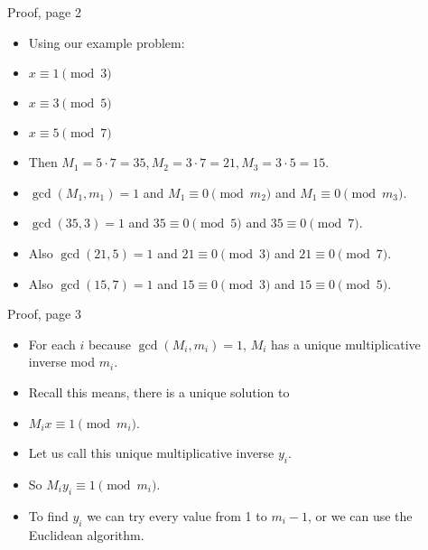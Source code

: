 \documentclass[handout]{beamer}
\begin{document}
\begin{frame}{Proof, page 2}

\begin{itemize}
  \item Using our example problem:
  \item $x \equiv 1 \pmod 3$
  \item $x \equiv 3 \pmod 5$
  \item $x \equiv 5 \pmod 7$
  \item Then $M_1 = 5\cdot 7 = 35, M_2 = 3\cdot 7 = 21, M_3 = 3\cdot 5 = 15$.
  \item $\gcd(M_1, m_1) = 1$ and $M_1 \equiv 0 \pmod {m_2}$ and $M_1 \equiv 0 \pmod {m_3}$.
  \item $\gcd(35,3) = 1$ and $35\equiv 0 \pmod 5$ and $35 \equiv 0 \pmod 7$.
  \item Also $\gcd(21,5) = 1$ and $21\equiv 0 \pmod 3$ and $21 \equiv 0 \pmod 7$.
  \item Also $\gcd(15,7) = 1$ and $15\equiv 0 \pmod 3$ and $15 \equiv 0 \pmod 5$.

\end{itemize}

\end{frame}


\begin{frame}{Proof, page 3}

\begin{itemize}
  \item For each $i$ because $\gcd(M_i, m_i)=1$, $M_i$ has a unique multiplicative inverse mod $m_i$.
  \item Recall this means, there is a unique solution to
  \item $M_i x \equiv 1 \pmod {m_i}$.
  \item Let us call this unique multiplicative inverse $y_i$.
  \item So $M_i y_i \equiv 1 \pmod {m_i}$.
  \item To find $y_i$ we can try every value from 1 to $m_i-1$, or we can use the Euclidean algorithm.
\end{itemize}

\end{frame}
\end{document}
